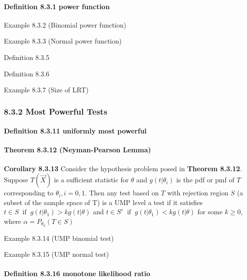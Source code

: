 \documentclass[6pt,Portrait]{article}
\let\oldparagraph\paragraph
\renewcommand{\paragraph}[1]{\oldparagraph{#1}\mbox{}}
\begin{document}
\hypertarget{power}{%
\paragraph{\texorpdfstring{\textbf{Definition 8.3.1 power
function}}{Definition 8.3.1 power function}}\label{power}}

Example 8.3.2 (Binomial power function)

Example 8.3.3 (Normal power function)

Definition 8.3.5

Definition 8.3.6

Example 8.3.7 (Size of LRT)

\hypertarget{most-powerful-tests}{%
\subsubsection{8.3.2 Most Powerful Tests}\label{most-powerful-tests}}

\hypertarget{UMP}{%
\paragraph{\texorpdfstring{\textbf{Definition 8.3.11 uniformly most
powerful}}{Definition 8.3.11 uniformly most powerful}}\label{UMP}}

\hypertarget{Neym-Pear}{%
\paragraph{\texorpdfstring{\textbf{Theorem 8.3.12 (Neyman-Pearson
Lemma)}}{Theorem 8.3.12 (Neyman-Pearson Lemma)}}\label{Neym-Pear}}

\textbf{Corollary 8.3.13} Consider the hypothesis problem posed in
\textbf{Theorem 8.3.12}. Suppose \(T(\vec X)\) is a sufficient statistic
for \(\theta\) and \(g(t|\theta_i)\) is the pdf or pmf of \(T\)
corresponding to \(\theta_i,i=0,1\). Then any test based on \(T\) with
rejection region \(S\) (a subset of the sample space of T) is a UMP
level a test if it satisfies
\(t\in S\ \text{ if }\ g(t|\theta_1)>kg(t|\theta)\) and
\(t\in S^c\ \text{ if }\ g(t|\theta_1)<kg(t|\theta)\) for some
\(k\ge 0\), where \(\alpha=P_{\theta_0}(T\in S)\)

Example 8.3.14 (UMP binomial test)

Example 8.3.15 (UMP normal test)

\hypertarget{MLR}{%
\paragraph{Definition 8.3.16 monotone likelihood ratio}\label{MLR}}
\end{document}

